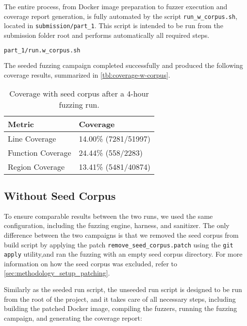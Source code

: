 \documentclass[11pt,a4paper,twocolumn]{article}
\begin{document}
The entire process, from Docker image preparation to fuzzer execution and coverage report generation, is fully automated by the script \texttt{run\_w\_corpus.sh}, located in \texttt{submission/part\_1}. This script is intended to be run from the submission folder root and performs automatically all required steps.

\begin{lstlisting}[language=bash, caption=Bash command to run an automated fuzzing campaign with seed corpus]
part_1/run.w_corpus.sh
\end{lstlisting}

The seeded fuzzing campaign completed successfully and produced the following coverage results, summarized in \autoref{tbl:coverage-w-corpus}.

\begin{table}[ht]
	\centering
	\begin{tabular}{@{}ll@{}}
		\toprule
		\textbf{Metric}   & \textbf{Coverage}    \\
		\midrule
		Line Coverage     & 14.00\% (7281/51997) \\
		Function Coverage & 24.44\% (558/2283)   \\
		Region Coverage   & 13.41\% (5481/40874) \\
		\bottomrule
	\end{tabular}
	\caption{Coverage with seed corpus after a 4-hour fuzzing run.}
	\label{tbl:coverage-w-corpus}
\end{table}

\subsection*{Without Seed Corpus} \label{sec:without-seed}

To ensure comparable results between the two runs, we used the same configuration, including the fuzzing engine, harness, and sanitizer. The only difference between the two campaigns is that we removed the seed corpus from build script by applying the patch \texttt{remove\_seed\_corpus.patch} using the \texttt{git apply} utility,and ran the fuzzing with an empty seed corpus directory. For more information on how the seed corpus was excluded, refer to \autoref{sec:methodology_setup_patching}.

Similarly as the seeded run script, the unseeded run script is designed to be run from the root of the project, and it takes care of all necessary steps, including building the patched Docker image, compiling the fuzzers, running the fuzzing campaign, and generating the coverage report:
\end{document}
